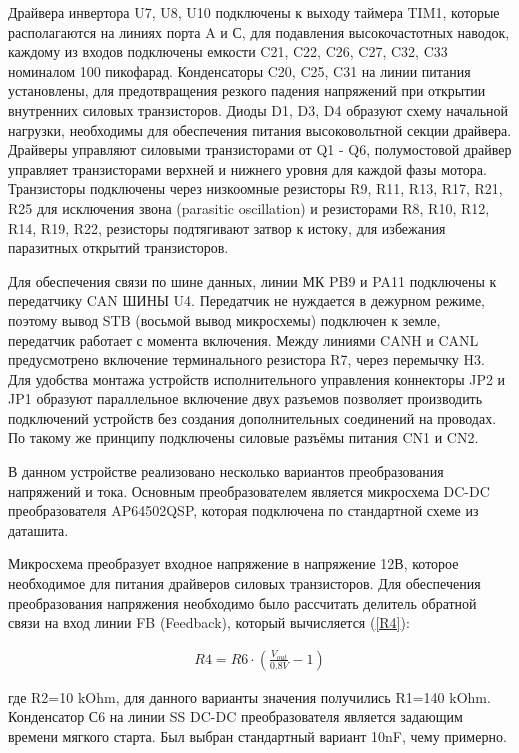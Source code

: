 Драйвера инвертора U7, U8, U10 подключены к выходу таймера TIM1, которые располагаются на линиях порта A и С, для подавления высокочастотных наводок, каждому из входов подключены емкости C21, C22, C26, C27, C32, C33 номиналом 100 пикофарад. Конденсаторы C20, C25, C31 на линии питания установлены, для предотвращения резкого падения напряжений при открытии внутренних силовых транзисторов.  Диоды D1, D3, D4 образуют схему начальной нагрузки, необходимы для обеспечения питания высоковольтной секции драйвера. Драйверы управляют силовыми транзисторами от Q1 - Q6, полумостовой драйвер управляет транзисторами верхней и нижнего уровня для каждой фазы мотора. Транзисторы подключены через низкоомные резисторы R9, R11, R13, R17, R21, R25 для исключения звона (parasitic oscillation) и резисторами R8, R10, R12, R14, R19, R22, резисторы подтягивают затвор к истоку, для избежания паразитных открытий транзисторов.

Для обеспечения связи по шине данных, линии МК PB9 и PA11 подключены к передатчику CAN ШИНЫ U4. Передатчик не нуждается в дежурном режиме, поэтому вывод STB (восьмой вывод микросхемы) подключен к земле, передатчик работает с момента включения. Между линиями CANH и CANL предусмотрено включение терминального резистора R7, через перемычку H3. Для удобства монтажа устройств исполнительного управления коннекторы JP2 и JP1 образуют параллельное включение двух разъемов позволяет производить подключений устройств без создания дополнительных соединений на проводах. По такому же принципу подключены силовые разъёмы питания CN1 и CN2.

В данном устройстве реализовано несколько вариантов преобразования напряжений и тока. Основным преобразователем является микросхема DC-DC преобразователя AP64502QSP, которая подключена по стандартной схеме из даташита.

Микросхема преобразует входное напряжение в напряжение 12В, которое необходимое для питания драйверов силовых транзисторов. Для обеспечения преобразования напряжения необходимо было рассчитать делитель обратной связи на вход линии FB (Feedback), который вычисляется (\ref{R4}):
\begin{ceqn}
	\begin{align} \label{R4}
		R4=R6\cdot(\frac{V_{out}}{0.8V}-1)
	\end{align}
\end{ceqn}
где R2=10 kOhm, для данного варианты значения получились R1=140 kOhm. Конденсатор С6 на линии SS DC-DC преобразователя является задающим времени мягкого старта. Был выбран стандартный вариант 10nF, чему примерно.

